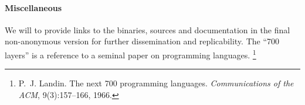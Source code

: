 \documentclass{article}
\begin{document}
\paragraph{Miscellaneous}
We will to provide links to the binaries, sources and documentation in
the final non-anonymous version for further dissemination and replicability.
The ``700 layers'' is a reference to a seminal
paper on programming languages.
\footnote{P.~J. Landin. The next 700 programming languages. {\em Communications of the ACM}, 9(3):157--166, 1966.}

%
%
%
\end{document}

